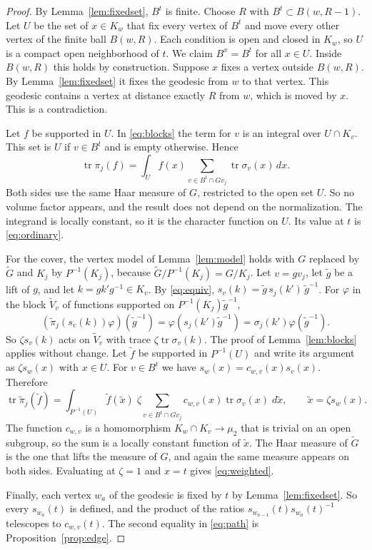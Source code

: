 \documentclass[12pt,letterpaper]{article}
\numberwithin{equation}{section}
\theoremstyle{definition}
\theoremstyle{remark}
\newcommand{\Mp}{\widetilde G}
\newcommand{\tr}{\operatorname{tr}}
\begin{document}
\begin{proof}
By Lemma~\ref{lem:fixedset}, $B^t$ is finite. Choose $R$ with $B^t\subset B(w,R-1)$. Let $U$ be the set of $x\in K_w$ that fix every vertex of $B^t$ and move every other vertex of the finite ball $B(w,R)$. Each condition is open and closed in $K_w$, so $U$ is a compact open neighborhood of $t$. We claim $B^x=B^t$ for all $x\in U$. Inside $B(w,R)$ this holds by construction. Suppose $x$ fixes a vertex outside $B(w,R)$. By Lemma~\ref{lem:fixedset} it fixes the geodesic from $w$ to that vertex. This geodesic contains a vertex at distance exactly $R$ from $w$, which is moved by $x$. This is a contradiction.

Let $f$ be supported in $U$. In \eqref{eq:blocks} the term for $v$ is an integral over $U\cap K_v$. This set is $U$ if $v\in B^t$ and is empty otherwise. Hence
\[
 \tr\pi_j(f)=\int_Uf(x)\sum_{v\in B^t\cap Gv_j}\tr\sigma_v(x)\,dx .
\]
Both sides use the same Haar measure of $G$, restricted to the open set $U$. So no volume factor appears, and the result does not depend on the normalization. The integrand is locally constant, so it is the character function on $U$. Its value at $t$ is \eqref{eq:ordinary}.

For the cover, the vertex model of Lemma~\ref{lem:model} holds with $G$ replaced by $\Mp$ and $K_j$ by $P^{-1}(K_j)$, because $\Mp/P^{-1}(K_j)=G/K_j$. Let $v=gv_j$, let $\widetilde g$ be a lift of $g$, and let $k=gk'g^{-1}\in K_v$. By \eqref{eq:equiv}, $s_v(k)=\widetilde g\,s_j(k')\,\widetilde g^{-1}$. For $\varphi$ in the block $\widetilde V_v$ of functions supported on $P^{-1}(K_j)\widetilde g^{-1}$,
\[
 (\widetilde\pi_j(s_v(k))\varphi)(\widetilde g^{-1})=\varphi(s_j(k')\widetilde g^{-1})=\sigma_j(k')\varphi(\widetilde g^{-1}).
\]
So $\zeta s_v(k)$ acts on $\widetilde V_v$ with trace $\zeta\tr\sigma_v(k)$. The proof of Lemma~\ref{lem:blocks} applies without change. Let $\widetilde f$ be supported in $P^{-1}(U)$ and write its argument as $\zeta s_w(x)$ with $x\in U$. For $v\in B^t$ we have $s_w(x)=c_{w,v}(x)s_v(x)$. Therefore
\[
 \tr\widetilde\pi_j(\widetilde f)=\int_{P^{-1}(U)}\widetilde f(\widetilde x)\;\zeta\!\!\sum_{v\in B^t\cap Gv_j}c_{w,v}(x)\tr\sigma_v(x)\;d\widetilde x,
 \qquad \widetilde x=\zeta s_w(x) .
\]
The function $c_{w,v}$ is a homomorphism $K_w\cap K_v\to\mu_2$ that is trivial on an open subgroup, so the sum is a locally constant function of $\widetilde x$. The Haar measure of $\Mp$ is the one that lifts the measure of $G$, and again the same measure appears on both sides. Evaluating at $\zeta=1$ and $x=t$ gives \eqref{eq:weighted}.

Finally, each vertex $w_a$ of the geodesic is fixed by $t$ by Lemma~\ref{lem:fixedset}. So every $s_{w_a}(t)$ is defined, and the product of the ratios $s_{w_{a-1}}(t)s_{w_a}(t)^{-1}$ telescopes to $c_{w,v}(t)$. The second equality in \eqref{eq:path} is Proposition~\ref{prop:edge}.
\end{proof}
\end{document}
